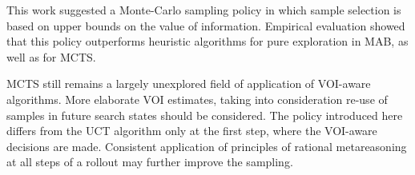 This work suggested a Monte-Carlo sampling policy in which sample
selection is based on upper bounds on the value of
information. Empirical evaluation showed that this policy outperforms
heuristic algorithms for pure exploration in MAB, as well as for MCTS.

MCTS still remains a largely unexplored field of
application of VOI-aware algorithms. More elaborate VOI estimates,
taking into consideration re-use of samples in future search states
should be considered. The policy introduced here differs from
the UCT algorithm only at the first step, where the VOI-aware
decisions are made. Consistent application of principles of rational
metareasoning at all steps of a rollout may further improve the
sampling.


